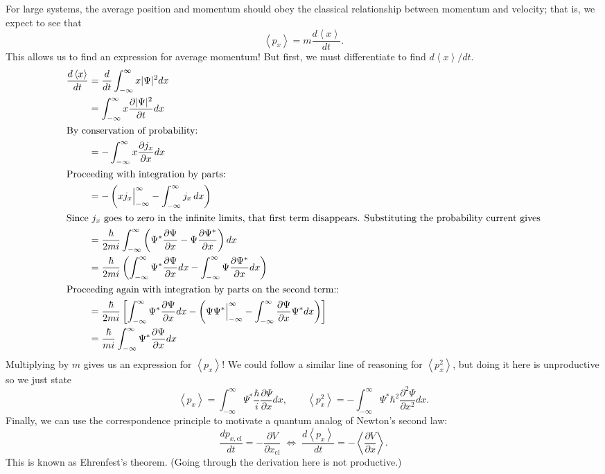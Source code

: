 \documentclass[../p052main.tex]{subfiles}
\begin{document}
For large systems, the average position and momentum should obey the classical relationship between momentum and velocity; that is, we expect to see that
\[ \left< p_x \right> = m \frac{d \left< x \right>}{dt}. \]
This allows us to find an expression for average momentum!
But first, we must differentiate to find $d \left< x \right> / dt$.
\begin{align*}
    \frac{d\left< x \right>}{dt} &= \frac{d}{dt} \int_{-\infty}^{\infty} x |\Psi|^2 dx \\
    &= \int_{-\infty}^{\infty} x \frac{\partial |\Psi|^2}{\partial t}dx \\
    \intertext{By conservation of probability:}
    &= -\int_{-\infty}^{\infty} x \frac{\partial j_x}{\partial x} dx \\
    \intertext{Proceeding with integration by parts:}
    &= -\left( x j_x \Big|_{-\infty}^\infty - \int_{-\infty}^{\infty} j_x \,dx \right) \\
    \intertext{Since $j_x$ goes to zero in the infinite limits, that first term disappears. Substituting the probability current gives}
    &= \frac{\hbar}{2mi} \int_{-\infty}^{\infty} \left( \Psi^* \frac{\partial \Psi}{\partial x} - \Psi \frac{\partial \Psi^*}{\partial x} \right) dx \\
    &= \frac{\hbar}{2mi} \left( \int_{-\infty}^{\infty} \Psi^* \frac{\partial \Psi}{\partial x} dx - \int_{-\infty}^{\infty} \Psi \frac{\partial \Psi^*}{\partial x} dx \right) \\
    \intertext{Proceeding again with integration by parts on the second term::}
    &= \frac{\hbar}{2mi} \left[ \int_{-\infty}^{\infty} \Psi^* \frac{\partial \Psi}{\partial x} dx - \left( \Psi \Psi^* \Big|_{-\infty}^\infty - \int_{-\infty}^{\infty} \frac{\partial \Psi}{\partial x} \Psi^* dx \right) \right] \\
    &= \frac{\hbar}{mi} \int_{-\infty}^\infty \Psi^* \frac{\partial \Psi}{\partial x} dx
\end{align*}
Multiplying by $m$ gives us an expression for $\left< p_x \right>$!
We could follow a similar line of reasoning for $\left< p_x^2 \right>$, but doing it here is unproductive so we just state
\[ \left< p_x \right> = \int_{-\infty}^\infty \Psi^* \frac{\hbar}{i} \frac{\partial \Psi}{\partial x} dx, \qquad \left< p_x^2 \right> = -\int_{-\infty}^\infty \Psi^* \hbar^2 \frac{\partial^2 \Psi}{\partial x^2} dx. \]
Finally, we can use the correspondence principle to motivate a quantum analog of Newton's second law:
\[ \frac{dp_{x,\textrm{cl}}}{dt} = -\frac{\partial V}{\partial x_\textrm{cl}} \;\Longleftrightarrow\; \frac{d \left< p_x \right>}{dt} = -\left< \frac{\partial V}{\partial x} \right>. \]
This is known as Ehrenfest's theorem.
(Going through the derivation here is not productive.)
\end{document}
